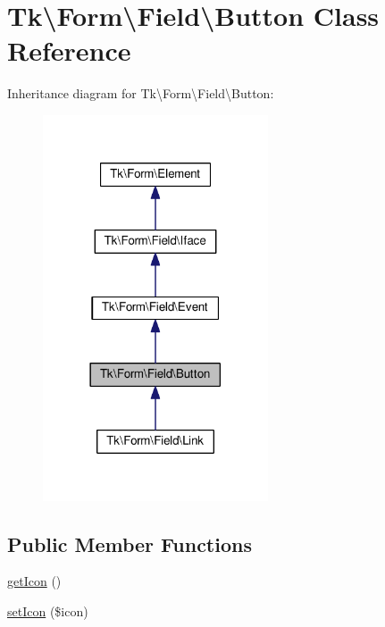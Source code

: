 \hypertarget{classTk_1_1Form_1_1Field_1_1Button}{\section{Tk\textbackslash{}Form\textbackslash{}Field\textbackslash{}Button Class Reference}
\label{classTk_1_1Form_1_1Field_1_1Button}
}


Inheritance diagram for Tk\textbackslash{}Form\textbackslash{}Field\textbackslash{}Button\+:\nopagebreak
\begin{figure}[H]
\begin{center}
\leavevmode
\includegraphics[width=189pt]{classTk_1_1Form_1_1Field_1_1Button__inherit__graph}
\end{center}
\end{figure}
\subsection*{Public Member Functions}
\begin{DoxyCompactItemize}
\item 
\hyperlink{classTk_1_1Form_1_1Field_1_1Button_af4ca506554db2c5e8016624184553b9c}{get\+Icon} ()
\item 
\hyperlink{classTk_1_1Form_1_1Field_1_1Button_ac914a992a73d35809f59f0eb2f2474c9}{set\+Icon} (\$icon)
\end{DoxyCompactItemize}
